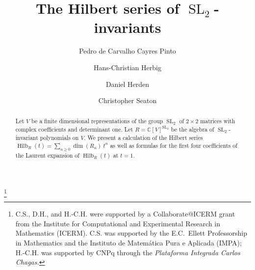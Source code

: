 \documentclass{amsart}
\theoremstyle{definition}
\theoremstyle{remark}
\newcommand{\C}{\mathbb{C}}
\newcommand{\SL}{\operatorname{SL}}
\newcommand{\Hilb}{\operatorname{Hilb}}
\begin{document}
\title{The Hilbert series of $\SL_2$-invariants}

\author[P.~de Carvalho Cayres Pinto]{Pedro de Carvalho Cayres Pinto}
\address{PEE/COPPE, Universidade Federal do Rio de Janeiro,
Av. Athos da Silveira Ramos 149, Centro de Tecnologia - Bloco H, Caixa postal 68504, CEP: 21941-972, Rio de Janeiro, Brazil}

\author[H.-C.~Herbig]{Hans-Christian Herbig}
\address{Departamento de Matem\'{a}tica Aplicada,
Av. Athos da Silveira Ramos 149, Centro de Tecnologia - Bloco C, CEP: 21941-909 - Rio de Janeiro, Brazil}

\author[D.~Herden]{Daniel Herden}
\address{Department of Mathematics, Baylor University,
One Bear Place \#97328,
Waco, TX 76798-7328, USA}

\author[C.~Seaton]{Christopher Seaton}
\address{Department of Mathematics and Computer Science,
Rhodes College, 2000 N. Parkway, Memphis, TN 38112}

\thanks{C.S., D.H., and H.-C.H. were supported by a Collaborate@ICERM grant from the Institute for Computational
and Experimental Research in Mathematics (ICERM). C.S. was supported by the E.C.~Ellett Professorship in Mathematics
and the Instituto de Matem\'{a}tica Pura e Aplicada (IMPA);  H.-C.H. was supported by CNPq through the
\emph{Plataforma Integrada Carlos Chagas.}}


\begin{abstract}
Let $V$ be a finite dimensional representations of the group $\SL_2$ of $2\times 2$ matrices with complex
coefficients and determinant one. Let $R=\C[V]^{\SL_2}$ be the algebra of $\SL_2$-invariant polynomials
on $V$. We present a calculation of the Hilbert series $\Hilb_R(t)=\sum_{n\ge 0}\dim (R_n)\: t^n$ as well
as formulas for the first four coefficients of the Laurent expansion of $\Hilb_R(t)$ at $t=1$.
\end{abstract}

\maketitle
\tableofcontents

\end{document}
